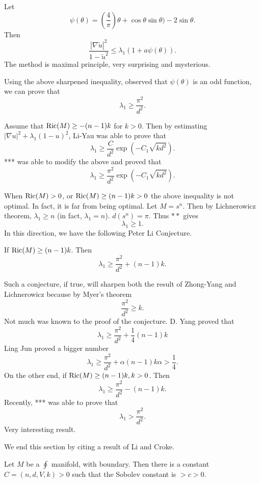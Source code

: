 \begin{theorem}[***] Let 
%
\[ \psi   (\theta) = \left(\frac{4}{\pi} \right)\theta + \cos \theta \sin \theta ) - 2 \sin \theta. \]
%
Then 
\[ \frac{|\nabla \tilde{u}|^2}{1 - \tilde{u}^2} \leq \lambda _1 (1 + a \psi (\theta))   . \]
%
The method is maximal principle, very surprising and mysterious.

Using the above sharpened inequality, observed that  $ \psi (\theta) $ is an odd function, we can prove that 
%
\[ \lambda _1 \geq \frac{\pi^2}{d^2}. \]
%

Assume that $ {\rm Ric} (M) \geq - (n-1) k $ for $ k > 0 $. Then by estimating $ | \nabla u|^2 + \lambda _1 ( 1 - u )^2 $, Li-Yau was able to prove that 
%
\[ \lambda _1 \geq \frac{C}{d^2} \exp ( - C_1 \sqrt{kd^2}).\]
%
*** was able to modify the above and proved that 
%
\[ \lambda _1 \geq \frac{\pi^2}{d^2} \exp ( - C_1 \sqrt{kd^2}).\]

When $ {\rm Ric}(M) > 0 $, or $ {\rm Ric}(M) \geq (n-1) k > 0 $ the above inequality is not optimal. In fact, it is far from being optimal. Let $ M = s ^n $. Then by Lichnerowicz theorem, $ \lambda _1\geq n $ (in fact, $ \lambda _ 1 = n $).
 $ d (s^n) = \pi $. Thus $ **$ gives 
%
\[\lambda _1 \geq 1 .\]
In this direction, we have the following Peter Li Conjecture.
\end{theorem}

\begin{conjecture}[P. Li] If $ {\rm Ric} (M) \geq (n-1) k $.  Then
%
\[ \lambda _ 1 \geq \frac{\pi^2}{d^2} + (n-1)k .\]
\end{conjecture}
Such a conjecture, if true, will sharpen both the result of Zhong-Yang and Lichnerowicz because by Myer's theorem
%
\[ \frac{\pi^2}{d^2} \geq k. \]
%
Not much was known to the proof of the conjecture. D. Yang proved that 
%
\[\lambda _1 \geq \frac{\pi^2}{d^2} + \frac{1}{4} ( n-1) k\]
%
Ling Jun proved a bigger number 
%
\[\lambda _1 \geq \frac{\pi^2}{d^2} + \alpha ( n-1) k  \alpha > \frac{1}{4} .\]
%
On the other end, if $ {\rm Ric} (M) \geq ( n-1) k, k > 0 $. Then 
%
\[ \lambda _1 \geq \frac{\pi^2}{d^2} - ( n-1) k.\]
%
Recently, *** was able to prove that 
%
\[ \lambda _1 > \frac{\pi^2}{d^2} .\]
Very interesting result.

We end this section by citing a result of Li and Croke.
\begin{theorem} Let $M$ be a $ \oint $ manifold, with boundary. Then there is a constant $ C = (n, d, V, k ) > 0 $ such that the Sobolev constant is $ > c > 0 $. 
\end{theorem}

